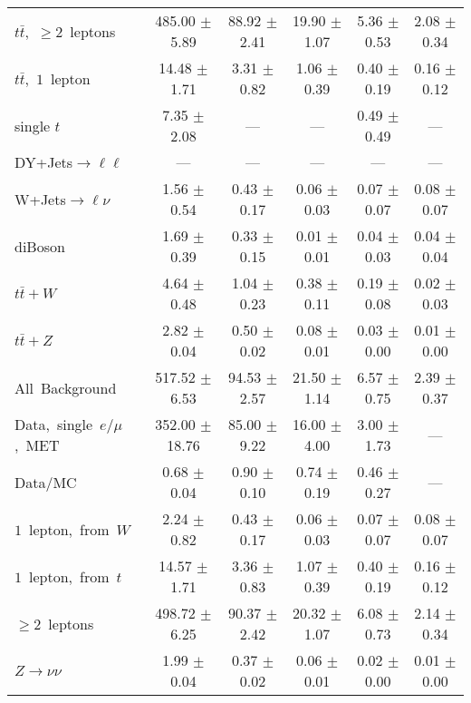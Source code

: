\documentclass{article}
\begin{document}
\begin{longtable}{|l|c|c|c|c|c|}
$t\bar{t}$,~$\ge2$~leptons & 485.00 $\pm$ 5.89  & 88.92 $\pm$ 2.41  & 19.90 $\pm$ 1.07  & 5.36 $\pm$ 0.53  & 2.08 $\pm$ 0.34 \\* 
$t\bar{t}$,~$1$~lepton & 14.48 $\pm$ 1.71  & 3.31 $\pm$ 0.82  & 1.06 $\pm$ 0.39  & 0.40 $\pm$ 0.19  & 0.16 $\pm$ 0.12 \\* 
single $t$  & 7.35 $\pm$ 2.08  & ---  & ---  & 0.49 $\pm$ 0.49  & --- \\* 
DY+Jets$\rightarrow\ell\ell$  & ---  & ---  & ---  & ---  & --- \\* 
W+Jets$\rightarrow\ell\nu$  & 1.56 $\pm$ 0.54  & 0.43 $\pm$ 0.17  & 0.06 $\pm$ 0.03  & 0.07 $\pm$ 0.07  & 0.08 $\pm$ 0.07 \\* 
diBoson  & 1.69 $\pm$ 0.39  & 0.33 $\pm$ 0.15  & 0.01 $\pm$ 0.01  & 0.04 $\pm$ 0.03  & 0.04 $\pm$ 0.04 \\* 
$t\bar{t}+W$  & 4.64 $\pm$ 0.48  & 1.04 $\pm$ 0.23  & 0.38 $\pm$ 0.11  & 0.19 $\pm$ 0.08  & 0.02 $\pm$ 0.03 \\* 
$t\bar{t}+Z$  & 2.82 $\pm$ 0.04  & 0.50 $\pm$ 0.02  & 0.08 $\pm$ 0.01  & 0.03 $\pm$ 0.00  & 0.01 $\pm$ 0.00 \\* 
\hline \hline 
All~Background  & 517.52 $\pm$ 6.53  & 94.53 $\pm$ 2.57  & 21.50 $\pm$ 1.14  & 6.57 $\pm$ 0.75  & 2.39 $\pm$ 0.37 \\* 
Data,~single~$e/\mu$,~MET  & 352.00 $\pm$ 18.76  & 85.00 $\pm$ 9.22  & 16.00 $\pm$ 4.00  & 3.00 $\pm$ 1.73  & --- \\* 
Data/MC  & 0.68 $\pm$ 0.04  & 0.90 $\pm$ 0.10  & 0.74 $\pm$ 0.19  & 0.46 $\pm$ 0.27  & --- \\* 
\hline \hline 
$1$~lepton,~from~$W$  & 2.24 $\pm$ 0.82  & 0.43 $\pm$ 0.17  & 0.06 $\pm$ 0.03  & 0.07 $\pm$ 0.07  & 0.08 $\pm$ 0.07 \\* 
$1$~lepton,~from~$t$  & 14.57 $\pm$ 1.71  & 3.36 $\pm$ 0.83  & 1.07 $\pm$ 0.39  & 0.40 $\pm$ 0.19  & 0.16 $\pm$ 0.12 \\* 
$\ge2$~leptons  & 498.72 $\pm$ 6.25  & 90.37 $\pm$ 2.42  & 20.32 $\pm$ 1.07  & 6.08 $\pm$ 0.73  & 2.14 $\pm$ 0.34 \\* 
$Z\rightarrow\nu\nu$  & 1.99 $\pm$ 0.04  & 0.37 $\pm$ 0.02  & 0.06 $\pm$ 0.01  & 0.02 $\pm$ 0.00  & 0.01 $\pm$ 0.00 \\* 
\hline 
\end{longtable} 

 
 
 
 
\pagebreak 

 
 
 
 
\end{document}
